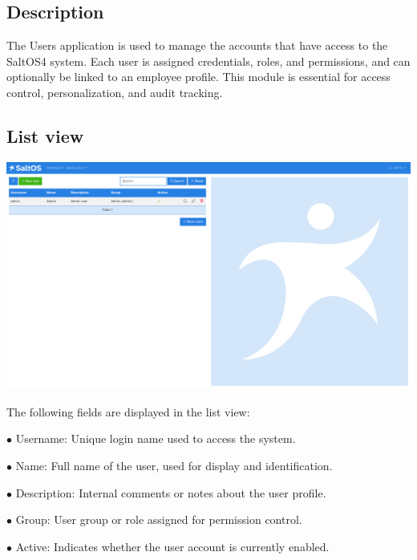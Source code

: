 \documentclass[a4paper]{article}
\begin{document}
\hypertarget{toc182}{}
\subsection{Description}

The Users application is used to manage the accounts that have access to the SaltOS4 system.
Each user is assigned credentials, roles, and permissions, and can optionally be linked to an employee profile.
This module is essential for access control, personalization, and audit tracking.

\hypertarget{toc183}{}
\subsection{List view}

\begin{center}\includegraphics[width=1\textwidth]{../ujest/snaps/test-screenshots-js-screenshots-users-users-list-en-us-1-snap.png}\end{center}

The following fields are displayed in the list view:

\begin{compactitem}
\item[\color{myblue}$\bullet$] Username: Unique login name used to access the system.
\item[\color{myblue}$\bullet$] Name: Full name of the user, used for display and identification.
\item[\color{myblue}$\bullet$] Description: Internal comments or notes about the user profile.
\item[\color{myblue}$\bullet$] Group: User group or role assigned for permission control.
\item[\color{myblue}$\bullet$] Active: Indicates whether the user account is currently enabled.
\end{compactitem}
\end{document}
